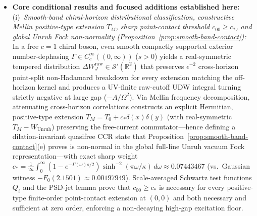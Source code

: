 \documentclass[11pt,a4paper]{article}
\theoremstyle{definition}
\theoremstyle{remark}
\newcommand{\bbR}{\mathbb{R}}
\newcommand{\1}{\mathbf{1}}
\begin{document}
\begin{itemize}
  \item \textbf{Core conditional results and focused additions established here:}
  (i)~\emph{Smooth-band chiral-horizon distributional classification, constructive Mellin positive-type extension $T_M$, sharp point-contact threshold $c_{00}\ge c_*$, and global Unruh Fock non-normality (Proposition~\ref{prop:smooth-band-contact}):} In a free $c=1$ chiral boson, even smooth compactly supported exterior number-dephasing $\Gamma\in C_c^\infty((0,\infty))$ ($s>0$) yields a real-symmetric tempered distribution $\Delta W_J^{\mathrm{raw}}\in\mathcal{S}'(\bbR^2)$ that preserves $\epsilon^{-2}$ cross-horizon point-split non-Hadamard breakdown for every extension matching the off-horizon kernel and produces a UV-finite raw-cutoff UDW integral turning strictly negative at large gap ($-A/\Omega^2$). Via Mellin frequency decomposition, attenuating cross-horizon correlations constructs an explicit Hermitian, positive-type extension $T_M = T_0 + c_*\delta(x)\delta(y)$ (with real-symmetric $T_M-W_{\mathrm{Unruh}}$) preserving the free-current commutator---hence defining a dilation-invariant quasifree CCR state \cite{ArakiShiraishi1971} that Proposition~\ref{prop:smooth-band-contact}(e) proves is non-normal in the global full-line Unruh vacuum Fock representation---with exact sharp weight $c_* = \frac{1}{2\kappa}\int_0^\infty(1-e^{-\Gamma(\omega)s/2})\sinh^{-2}(\pi\omega/\kappa)\,d\omega \approx 0.07443467$ (vs.\ Gaussian witness $-F_0(2.1501)\approx 0.00197949$). Scale-averaged Schwartz test functions $Q_\ell$ and the PSD-jet lemma prove that $c_{00}\ge c_*$ is necessary for every positive-type finite-order point-contact extension at $(0,0)$ and both necessary and sufficient at zero order, enforcing a non-decaying high-gap excitation floor.

\end{itemize}
\end{document}
